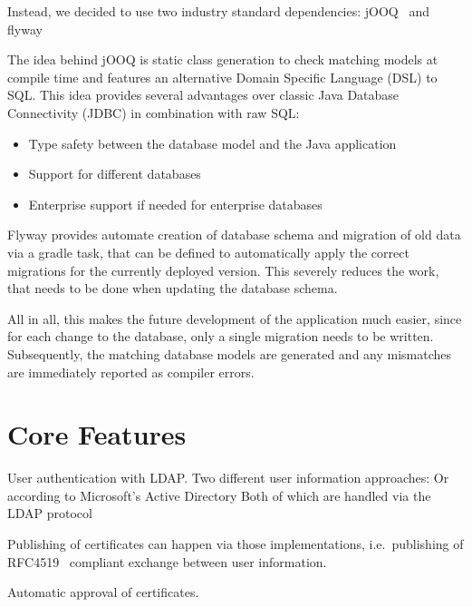 Instead, we decided to use two industry standard dependencies: jOOQ~\cite{jooq} and flyway~\cite{flyway}

The idea behind jOOQ is static class generation to check matching models at compile time and features an alternative
Domain Specific Language (DSL) to SQL\@.
This idea provides several advantages over classic Java Database Connectivity (JDBC) in combination with raw SQL:
\begin{itemize}
\item Type safety between the database model and the Java application
\item Support for different databases
\item Enterprise support if needed for enterprise databases
\end{itemize}

Flyway provides automate creation of database schema and migration of old data via a gradle task, that can be defined to
automatically apply the correct migrations for the currently deployed version.
This severely reduces the work, that needs to be done when updating the database schema.

All in all, this makes the future development of the application much easier, since for each change to the database,
only a single migration needs to be written.
Subsequently, the matching database models are generated and any mismatches are immediately reported as compiler errors.

\section{Core Features}\label{sec:coreFeatures}
User authentication with LDAP. %
Two different user information approaches:
Or according to Microsoft's Active Directory
Both of which are handled via the LDAP protocol %

Publishing of certificates can happen via those implementations, i.e.\ publishing of RFC4519~\cite{RFC4519} compliant
exchange between user information.

Automatic approval of certificates.
